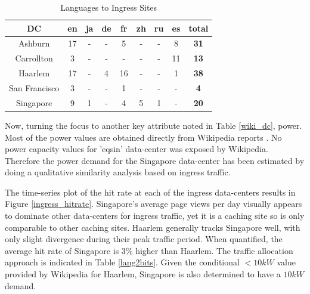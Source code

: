 \documentclass[conference]{IEEEtran}
\begin{document}
\begin{table}[htbp]
\caption{Languages to Ingress Sites}
\begin{center}
\begin{tabular}{|c|c|c|c|c|c|c|c|c|}
\hline
DC            &  en & ja & de &  fr & zh & ru &  es & \textbf{total} \\
\hline
Ashburn       &  17 &  - &  - &   5 &  - &  - &   8 & \textbf{31} \\
Carrollton    &   3 &  - &  - &   - &  - &  - &  11 & \textbf{13} \\
Haarlem       &  17 &  - &  4 &  16 &  - &  - &   1 & \textbf{38} \\
San Francisco &   3 &  - &  - &   1 &  - &  - &   - & \textbf{4}  \\
Singapore     &   9 &  1 &  - &   4 &  5 &  1 &   - & \textbf{20} \\
\hline
\end{tabular}
\label{ingress_lang}
\end{center}
\end{table}

Now, turning the focus to another key attribute noted in Table \ref{wiki_dc}, power. Most of the power values are obtained directly from Wikipedia reports \cite{wiki_servers}. No power capacity values for 'eqsin' data-center was exposed by Wikipedia. Therefore the power demand for the Singapore data-center has been estimated by doing a qualitative similarity analysis based on ingress traffic.

The time-series plot of the hit rate at each of the ingress data-centers results in Figure \ref{ingress_hitrate}. Singapore's average page views per day visually appears to dominate other data-centers for ingress traffic, yet it is a caching site so is only comparable to other caching sites. Haarlem generally tracks Singapore well, with only slight divergence during their peak traffic period. When quantified, the average hit rate of Singapore is 3\% higher than Haarlem. The traffic allocation approach is indicated in Table \ref{lang2bits}. Given the conditional $<10kW$ value provided by Wikipedia for Haarlem, Singapore is also determined to have a $10kW$ demand. 
\end{document}
